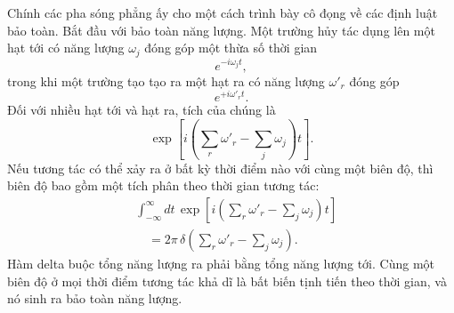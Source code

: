 Chính các pha sóng phẳng ấy cho một cách trình bày cô đọng về các định luật bảo toàn. Bắt đầu với bảo toàn năng lượng. Một trường hủy tác dụng lên một hạt tới có năng lượng \(\omega_j\) đóng góp một thừa số thời gian
\begin{equation}
e^{-i\omega_j t},
\end{equation}
trong khi một trường tạo tạo ra một hạt ra có năng lượng \(\omega'_r\) đóng góp
\begin{equation}
e^{+i\omega'_r t}.
\end{equation}
Đối với nhiều hạt tới và hạt ra, tích của chúng là
\begin{equation}
\exp\!\left[
i\left(\sum_r\omega'_r-\sum_j\omega_j\right)t
\right].
\end{equation}
Nếu tương tác có thể xảy ra ở bất kỳ thời điểm nào với cùng một biên độ, thì biên độ bao gồm một tích phân theo thời gian tương tác:
\begin{equation}
\begin{aligned}
&\int_{-\infty}^{\infty}dt\,
\exp\!\left[
i\left(\sum_r\omega'_r-\sum_j\omega_j\right)t
\right]
\\
&\quad =2\pi\,
\delta\!\left(\sum_r\omega'_r-\sum_j\omega_j\right).
\end{aligned}
\end{equation}
Hàm delta buộc tổng năng lượng ra phải bằng tổng năng lượng tới. Cùng một biên độ ở mọi thời điểm tương tác khả dĩ là bất biến tịnh tiến theo thời gian, và nó sinh ra bảo toàn năng lượng.

